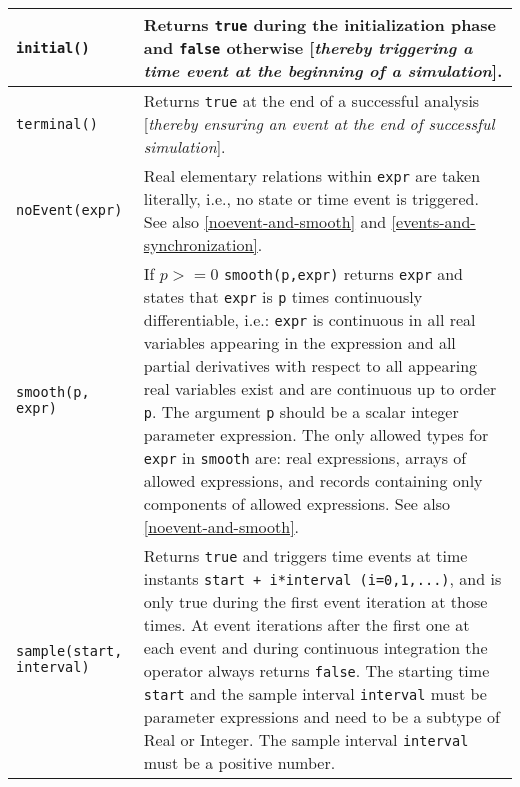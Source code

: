 \begin{longtable}{|p{5cm}|p{8cm}|}
\hline \endhead

\lstinline!initial()! & Returns \lstinline!true! during the initialization phase and \lstinline!false!
otherwise {[}\emph{thereby triggering a time event at the beginning of a
simulation}{]}.\\ \hline

\lstinline!terminal()! & Returns \lstinline!true! at the end of a successful analysis
{[}\emph{thereby ensuring an event at the end of successful
simulation}{]}.\\ \hline

\lstinline!noEvent(expr)! & Real elementary relations within \lstinline!expr! are taken literally, i.e., no state or time event is triggered. See also \autoref{noevent-and-smooth} and \autoref{events-and-synchronization}.\\ \hline

\lstinline!smooth(p, expr)! & If $p>=0$ \lstinline!smooth(p,expr)!
returns \lstinline!expr! and states that \lstinline!expr! is \lstinline!p! times continuously
differentiable, i.e.: \lstinline!expr! is continuous in all real variables appearing
in the expression and all partial derivatives with respect to all
appearing real variables exist and are continuous up to order
\lstinline!p!. The argument \lstinline!p! should be a scalar integer parameter
expression. The only allowed types for \lstinline!expr! in \lstinline!smooth! are: real
expressions, arrays of allowed expressions, and records containing only
components of allowed expressions. See also \autoref{noevent-and-smooth}.\\ \hline

\lstinline!sample(start, interval)! & Returns \lstinline!true! and triggers time events at time
instants \lstinline!start + i*interval (i=0,1,...)!, and is only true during the first event iteration at those times.
At event iterations after the first one at each event and during continuous integration
the operator always returns \lstinline!false!. The starting time \lstinline!start! and the
sample interval \lstinline!interval! must be parameter expressions and need to be
a subtype of Real or Integer. The sample interval \lstinline!interval! must be a
positive number.\\ \hline


\end{longtable}
